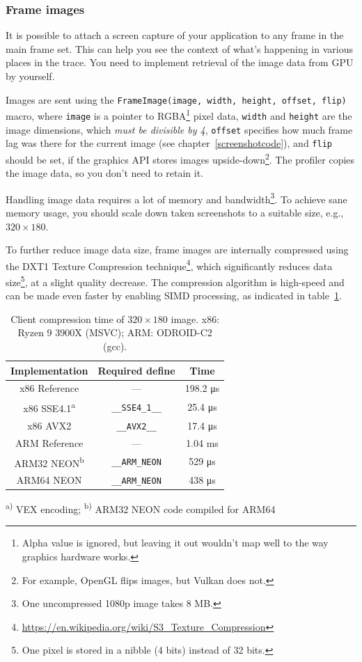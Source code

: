 \documentclass[hidelinks,titlepage,a4paper]{article}
\begin{document}
\subsubsection{Frame images}
\label{frameimages}

It is possible to attach a screen capture of your application to any frame in the main frame set. This can help you see the context of what's happening in various places in the trace. You need to implement retrieval of the image data from GPU by yourself.

Images are sent using the \texttt{FrameImage(image, width, height, offset, flip)} macro, where \texttt{image} is a pointer to RGBA\footnote{Alpha value is ignored, but leaving it out wouldn't map well to the way graphics hardware works.} pixel data, \texttt{width} and \texttt{height} are the image dimensions, which \emph{must be divisible by 4}, \texttt{offset} specifies how much frame lag was there for the current image (see chapter~\ref{screenshotcode}), and \texttt{flip} should be set, if the graphics API stores images upside-down\footnote{For example, OpenGL flips images, but Vulkan does not.}. The profiler copies the image data, so you don't need to retain it.

Handling image data requires a lot of memory and bandwidth\footnote{One uncompressed 1080p image takes 8 MB.}. To achieve sane memory usage, you should scale down taken screenshots to a suitable size, e.g., $320\times180$.

To further reduce image data size, frame images are internally compressed using the DXT1 Texture Compression technique\footnote{\url{https://en.wikipedia.org/wiki/S3_Texture_Compression}}, which significantly reduces data size\footnote{One pixel is stored in a nibble (4 bits) instead of 32 bits.}, at a slight quality decrease. The compression algorithm is high-speed and can be made even faster by enabling SIMD processing, as indicated in table~\ref{EtcSimd}.

\begin{table}[h]
\centering
\begin{tabular}[h]{c|c|c}
\textbf{Implementation} & \textbf{Required define} & \textbf{Time} \\ \hline
x86 Reference & --- & 198.2 \si{\micro\second} \\
x86 SSE4.1\textsuperscript{a} & \texttt{\_\_SSE4\_1\_\_} & 25.4 \si{\micro\second} \\
x86 AVX2 & \texttt{\_\_AVX2\_\_} & 17.4 \si{\micro\second} \\
ARM Reference & --- & 1.04 \si{\milli\second} \\
ARM32 NEON\textsuperscript{b} & \texttt{\_\_ARM\_NEON} & 529 \si{\micro\second} \\
ARM64 NEON & \texttt{\_\_ARM\_NEON} & 438 \si{\micro\second}
\end{tabular}

\vspace{1em}
\textsuperscript{a)} VEX encoding; \hspace{0.5em} \textsuperscript{b)} ARM32 NEON code compiled for ARM64
\caption{Client compression time of $320\times180$ image. x86: Ryzen 9 3900X (MSVC); ARM: ODROID-C2 (gcc).}
\label{EtcSimd}
\end{table}
\end{document}
